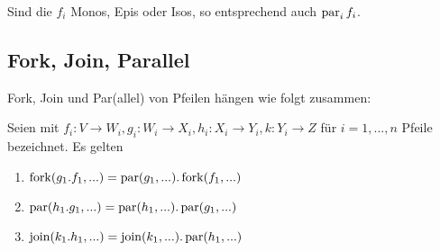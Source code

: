 \begin{prop} Sind die $f_i$ Monos, Epis oder Isos, so entsprechend auch $\operatorname{par}_i f_i$.
\end{prop}

\subsection{Fork, Join, Parallel}


Fork, Join und Par(allel) von Pfeilen hängen wie folgt zusammen:

\begin{prop}
Seien mit $f_i : V\to W_i, g_i : W_i \to X_i, h_i : X_i \to Y_i, k : Y_i \to Z$ für $i=1,...,n$ Pfeile bezeichnet.
Es gelten
\begin{enumerate}
\item $\operatorname{fork}(g_1.f_1,...) = \operatorname{par}(g_1,...).\operatorname{fork}(f_1,...)$
\item $\operatorname{par}(h_1.g_1,...) = \operatorname{par}(h_1,...).\operatorname{par}(g_1,...)$
\item $\operatorname{join}(k_1.h_1,...) = \operatorname{join}(k_1,...).\operatorname{par}(h_1,...)$
\end{enumerate}
\end{prop}
